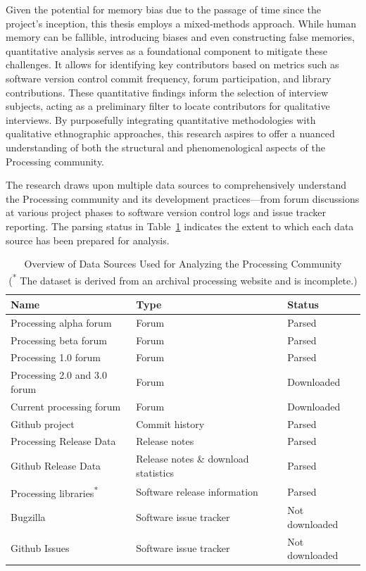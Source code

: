 Given the potential for memory bias due to the passage of time since the project's inception, this thesis employs a mixed-methods approach. While human memory can be fallible, introducing biases and even constructing false memories, quantitative analysis serves as a foundational component to mitigate these challenges. It allows for identifying key contributors based on metrics such as software version control commit frequency, forum participation, and library contributions. These quantitative findings inform the selection of interview subjects, acting as a preliminary filter to locate contributors for qualitative interviews.
By purposefully integrating quantitative methodologies with qualitative ethnographic approaches, this research aspires to offer a nuanced understanding of both the structural and phenomenological aspects of the Processing community.

The research draws upon multiple data sources to comprehensively understand the Processing community and its development practices—from forum discussions at various project phases to software version control logs and issue tracker reporting. The parsing status in Table~\ref{tab:data-sources} indicates the extent to which each data source has been prepared for analysis. 
%      

\begin{table}
    \begin{adjustbox}{center}
    \begin{tabular}{l l l}
        \toprule
        Name & Type & Status \\
        \midrule
        Processing alpha forum & Forum & Parsed \\
        Processing beta forum & Forum & Parsed  \\
        Processing 1.0 forum & Forum & Parsed \\
        Processing 2.0 and 3.0 forum & Forum  & Downloaded \\
        Current processing forum & Forum & Downloaded \\
        Github project & Commit history & Parsed \\
        Processing Release Data & Release notes & Parsed \\
        Github Release Data & Release notes \& download statistics & Parsed \\
        Processing libraries\textsuperscript{*} & Software release information & Parsed \\
        Bugzilla & Software issue tracker & Not downloaded \\
        Github Issues & Software issue tracker & Not downloaded \\
        \bottomrule
    \end{tabular}
    \end{adjustbox}
    \caption{Overview of Data Sources Used for Analyzing the Processing Community\\(\textsuperscript{*} The dataset is derived from an archival processing website and is incomplete.)}
    \label{tab:data-sources}
  \end{table}

